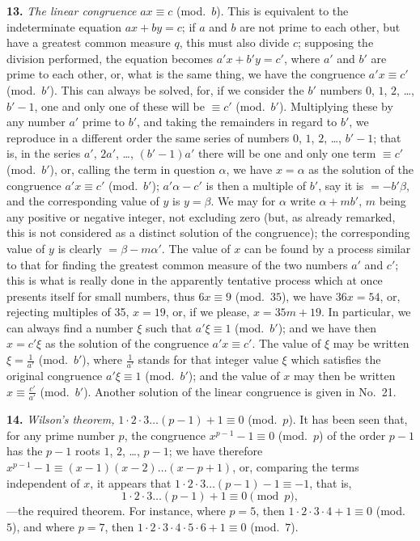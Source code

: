 \documentclass[11pt,a4paper]{book}
\begin{document}
\textbf{13.}\quad
\textit{The linear congruence} $ax \equiv c$ (mod.\ $b$). This is equivalent to the indeterminate equation $ax + by = c$; if $a$ and $b$ are not prime to each other, but have a greatest common measure $q$, this must also divide $c$; supposing the division performed, the equation becomes $a'x + b'y = c'$, where $a'$ and $b'$ are prime to each other, or, what is the same thing, we have the congruence $a'x \equiv c'$ (mod.\ $b'$). This can always be solved, for, if we consider the $b'$ numbers $0$, $1$, $2$, \ldots, $b' - 1$, one and only one of these will be $\equiv c'$ (mod.\ $b'$). Multiplying these by any number $a'$ prime to $b'$, and taking the remainders in regard to $b'$, we reproduce in a different order the same series of numbers $0$, $1$, $2$, \ldots, $b' - 1$; that is, in the series $a'$, $2a'$, \ldots, $(b' - 1)a'$ there will be one and only one term $\equiv c'$ (mod.\ $b'$), or, calling the term in question $\alpha$, we have $x = \alpha$ as the solution of the congruence $a'x \equiv c'$ (mod.\ $b'$); $a'\alpha - c'$ is then a multiple of $b'$, say it is $= -b'\beta$, and the corresponding value of $y$ is $y = \beta$. We may for $\alpha$ write $\alpha + mb'$, $m$ being any positive or negative integer, not excluding zero (but, as already remarked, this is not considered as a distinct solution of the congruence); the corresponding value of $y$ is clearly $= \beta - m\alpha'$. The value of $x$ can be found by a process similar to that for finding the greatest common measure of the two numbers $a'$ and $c'$; this is what is really done in the apparently tentative process which at once presents itself for small numbers, thus $6x \equiv 9$ (mod.\ $35$), we have $36x = 54$, or, rejecting multiples of 35, $x = 19$, or, if we please, $x = 35m + 19$. In particular, we can always find a number $\xi$ such that $a'\xi \equiv 1$ (mod.\ $b'$); and we have then $x = c'\xi$ as the solution of the congruence $a'x \equiv c'$. The value of $\xi$ may be written $\xi = \frac{1}{a'}$ (mod.\ $b'$), where $\frac{1}{a'}$ stands for that integer value $\xi$ which satisfies the original congruence $a'\xi \equiv 1$ (mod.\ $b'$); and the value of $x$ may then be written $x \equiv \frac{c'}{a'}$ (mod.\ $b'$). Another solution of the linear congruence is given in No.~21.

\textbf{14.}\quad
\textit{Wilson's theorem,} $1 \cdot 2 \cdot 3 \ldots (p - 1) + 1 \equiv 0$ (mod.\ $p$). It has been seen that, for any prime number $p$, the congruence $x^{p-1} - 1 \equiv 0$ (mod.\ $p$) of the order $p - 1$ has the $p - 1$ roots $1$, $2$, \ldots, $p - 1$; we have therefore $x^{p-1} - 1 \equiv (x - 1)(x - 2) \ldots (x - p + 1)$, or, comparing the terms independent of $x$, it appears that $1 \cdot 2 \cdot 3 \ldots (p - 1) - 1 \equiv -1$, that is,
\[
1 \cdot 2 \cdot 3 \ldots (p - 1) + 1 \equiv 0 \pmod{p},
\]
---the required theorem. For instance, where $p = 5$, then $1 \cdot 2 \cdot 3 \cdot 4 + 1 \equiv 0$ (mod.\ $5$), and where $p = 7$, then $1 \cdot 2 \cdot 3 \cdot 4 \cdot 5 \cdot 6 + 1 \equiv 0$ (mod.\ $7$).
\end{document}
